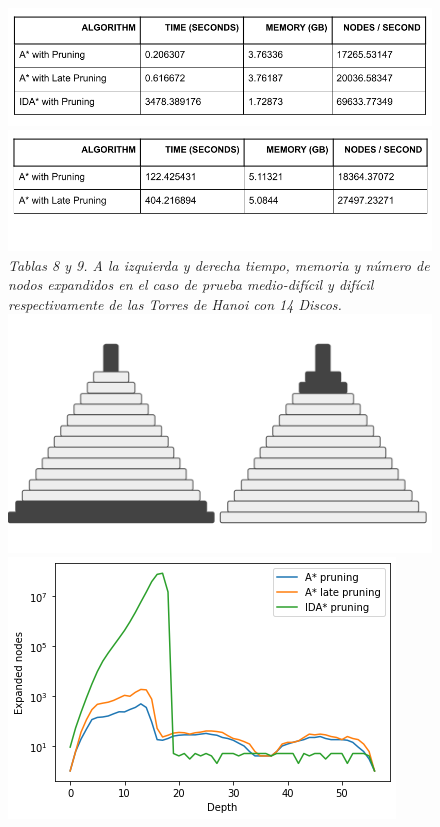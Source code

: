 \documentclass[a4paper,10pt]{article}
\begin{document}
    \begin{figure}[t!]
      \centering
      \includegraphics[scale=0.3]{hanois14D/tabla_medio.png}
      \includegraphics[scale=0.3]{hanois14D/tabla_dificil.png}\\
      \textit{\small{Tablas 8 y 9. A la izquierda y derecha tiempo, 
      memoria y n\'umero de nodos expandidos en el caso de prueba medio-dif\'icil y dif\'icil
      respectivamente de las Torres de Hanoi con 14 Discos.}}\\
      \includegraphics[scale=0.2]{hanois14D/pdb.png}
      \includegraphics[scale=0.4]{hanois14D/hanois14_medium.png} 

\end{figure}
\end{document}
